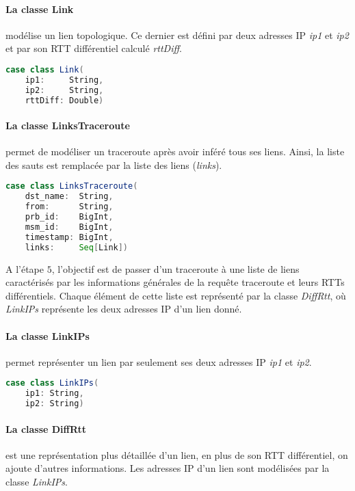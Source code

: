 \paragraph{La classe Link} modélise un lien topologique. Ce dernier est défini par deux adresses IP  \textit{ip1} et \textit{ip2} et par son RTT différentiel calculé \textit{rttDiff}.
\begin{lstlisting}[language=scala, caption={La classe Link en Scala }]
case class Link(
	ip1:     String,
	ip2:     String,
	rttDiff: Double)
\end{lstlisting}

\paragraph{La classe LinksTraceroute} permet de modéliser un traceroute après avoir inféré tous ses liens. Ainsi, la liste des sauts est remplacée par la liste des liens (\textit{links}). 

\begin{lstlisting}[language=scala, caption={La classe LinksTraceroute en Scala }]
case class LinksTraceroute(
	dst_name:  String,
	from:      String,
	prb_id:    BigInt,
	msm_id:    BigInt,
	timestamp: BigInt,
	links:     Seq[Link])
\end{lstlisting}


A l'étape $5$, l'objectif est de passer d'un traceroute à une liste de liens caractérisés par les informations générales de la requête traceroute et leurs RTTs différentiels. Chaque élément de cette liste est représenté par la classe \textit{DiffRtt}, où \textit{LinkIPs} représente les deux adresses IP d'un lien donné.
\paragraph{La classe LinkIPs} permet représenter un lien par seulement ses deux adresses IP \textit{ip1} et \textit{ip2}.
\begin{lstlisting}[language=scala, caption={La classe LinkIPs en Scala }]
case class LinkIPs(
	ip1: String,
	ip2: String)
\end{lstlisting}

\paragraph{La classe DiffRtt} est une représentation plus détaillée d'un lien, en plus de son RTT différentiel, on ajoute d'autres informations.  Les adresses IP d'un lien sont modélisées par la classe \textit{LinkIPs}.

